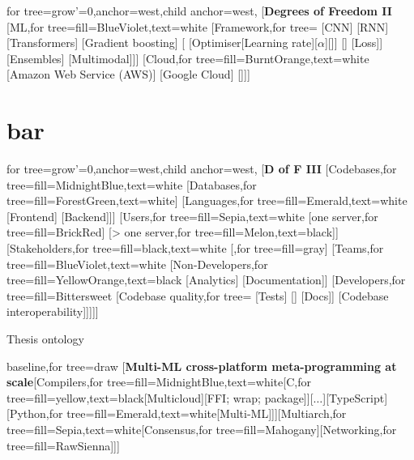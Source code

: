 \documentclass[aspectratio=169,xcolor=dvipsnames]{beamer}
\def\myTitle{Multi-ML cross-platform meta-programming at scale}
\begin{document}
\begin{frame}
	\begin{forest} for tree={grow'=0,anchor=west,child anchor=west},
		[\textbf{Degrees of Freedom II}
				[ML,for tree={fill=BlueViolet,text=white}
						[Framework,for tree={}
								[CNN]
								[RNN]
								[Transformers]
								[Gradient boosting]
								[\textellipsis{}
									[Optimiser[Learning rate][\(\alpha\)][\textellipsis{}]]
									[\textellipsis{}]
									[Loss]]
								[Ensembles]
								[Multimodal]]]
				[Cloud,for tree={fill=BurntOrange,text=white}
						[Amazon Web Service (AWS)]
						[Google Cloud]
						[\textellipsis{}]]]
	\end{forest}
\end{frame}

\part[foo]{bar}

\begin{frame}
	\begin{forest} for tree={grow'=0,anchor=west,child anchor=west}, [\textbf{D of F III}
				[Codebases,for tree={fill=MidnightBlue,text=white}
						[Databases,for tree={fill=ForestGreen,text=white}]
						[Languages,for tree={fill=Emerald,text=white}
								[Frontend]
								[Backend]]]
				[Users,for tree={fill=Sepia,text=white}
						[one server,for tree={fill=BrickRed}]
						[\textgreater{} one server,for tree={fill=Melon,text=black}]]
				[Stakeholders,for tree={fill=black,text=white}
						[\textellipsis{},for tree={fill=gray}]
						[Teams,for tree={fill=BlueViolet,text=white}
								[Non-Developers,for tree={fill=YellowOrange,text=black}
										[Analytics]
										[Documentation]]
								[Developers,for tree={fill=Bittersweet}
										[Codebase quality,for tree={}
												[Tests]
												[\textellipsis{}]
												[Docs]]
										[Codebase interoperability]]]]]
	\end{forest}
\end{frame}

\begin{frame}{Thesis ontology}
	\begin{forest} baseline,for tree=draw
		[\textbf{\myTitle}[Compilers,for tree={fill=MidnightBlue,text=white}[C,for tree={fill=yellow,text=black}[Multicloud][FFI; wrap; package]][\(\ldots\)][TypeScript][Python,for tree={fill=Emerald,text=white}[Multi-ML]]][Multiarch,for tree={fill=Sepia,text=white}[Consensus,for tree={fill=Mahogany}][Networking,for tree={fill=RawSienna}]]]
	\end{forest}
\end{frame}
\end{document}
